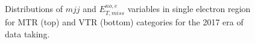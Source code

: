 \begin{figure}[htbp]
{    }
  \caption{Distributions of $mjj$ and $E_{T,miss}^{no,e}$ variables in single electron region for MTR (top) and VTR (bottom) categories for the 2017 era of data taking.}
  \label{fig:2017_Wenu_1}
\end{figure}

